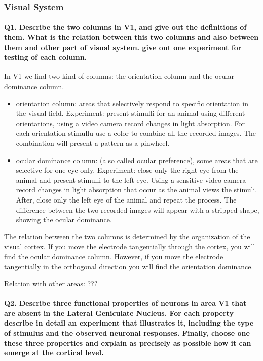 \documentclass[12pt,article,oneside,a4paper]{memoir}
\begin{document}
\subsubsection{Visual System}
\paragraph{Q1. Describe the two columns in V1, and give out the definitions of them. What is the relation between this two columns and also between them and other part of visual system. give out one experiment for testing of each column.}
In V1 we find two kind of columns: the orientation column and the ocular dominance column.
\begin{itemize}
\item orientation column: areas that selectively respond to specific orientation in the visual field. Experiment: present stimulli for an animal using different orientations, using a video camera record changes in light absorption. For each orientation stimullu use a color to combine all the recorded images. The combination will present a pattern as a pinwheel.
\item ocular dominance column: (also called ocular preference), some areas that are selective for one eye only. Experiment: close only the right eye from the animal and present stimulli to the left eye. Using a sensitive video camera record changes in light absorption that occur as the animal views the stimuli. After, close only the left eye of the animal and repeat the process. The difference between the two recorded images will appear with a stripped-shape, showing the ocular dominance.
\end{itemize}

The relation between the two columns is determined by the organization of the visual cortex. If you move the electrode tangentially through the cortex, you will find the ocular dominance column. However, if you move the electrode tangentially in the orthogonal direction you will find the orientation dominance.

Relation with other areas: ???


\paragraph{Q2. Describe three functional properties of neurons in area V1 that are absent in the Lateral Geniculate Nucleus. For each property describe in detail an experiment that illustrates it, including the type of stimulus and the observed neuronal responses. Finally, choose one these three properties and explain as precisely as possible how it can emerge at the cortical level.}
\end{document}
